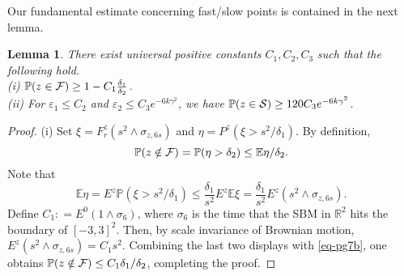 \documentclass[11pt]{article}
\newtheorem{lemma}[theorem]{Lemma}
\theoremstyle{definition}
\def \e {\varepsilon}
\def \d {\delta}
\def \E {{\mathbb{E}}}
\def \ff {{\cal F}}
\def \P {{\mathbb{P}}}
\def \R {{\mathbb{R}}}
\def \s {\sigma}
\def \ss {{\cal S}}
\begin{document}
Our fundamental estimate concerning fast/slow points is contained in the next lemma.
 \begin{lemma} \label{Lemma.fastpoint}
There exist universal positive constants $C_1, C_2, C_3$
such that the following hold.\\
{\rm (i)} $\P (z \in \ff) \ge 1 - C_1 \frac {\d_1} {\d_2} $. \\
{\rm (ii)} For $\e_1 \le C_2$ and $\e_2 \le C_3 e^{- 6 k \gamma^2}$,
we have $\P (z \in \ss) \ge 120 C_3 e^{- 6 k \gamma^2}$.
 \end{lemma}
 \begin{proof}
(i) Set $\xi = F_r^z (s^2 \wedge \s_{z,6s} ) $ and $\eta = P^z ( \xi > s^2 / \d_1 )$. By definition,
\begin{equation}
  \label{eq-pg7b}
  \P (z \notin \ff ) = \P (\eta > \d_2) \le \E \eta / \d_2.
\end{equation}
Note that
 $$
\E \eta = E^z \P (\xi > s^2 / \d_1 ) \le \frac{\d_1} {s^2} E^z \E \xi = \frac{\d_1} {s^2} E^z (s^2 \wedge \s_{z,6s} ).
 $$
Define $C_1 : = E^0 ( 1 \wedge \s_6 )$, where $\s_6$ is
the time that the SBM in $\R^2$ hits the boundary of $[-3,3]^2$.
Then, by scale invariance of Brownian motion,
$E^z (s^2 \wedge \s_{z, 6s} ) = C_1 s^2$.
Combining the last two displays with
\eqref{eq-pg7b}, one obtains
$\P (z \notin \ff ) \le C_1 \d_1 / \d_2$, completing the proof.


\end{proof}
\end{document}
